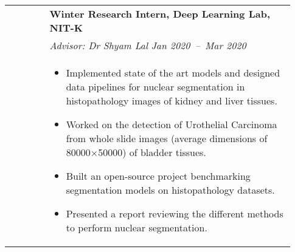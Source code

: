 \documentclass[letterpaper, 10pt, oneside]{article}
\newcommand{\bdit}[1]{{\textbf{#1}}}
\begin{document}
\begin{longtable}{@{} p{0.13\linewidth} p{0.8\linewidth}}
                         & \bdit{Winter Research Intern, Deep Learning Lab, NIT-K}                                                                                                                                                           \\
                         & \textsl{Advisor: Dr Shyam Lal} \hfill \hspace{-3em} \textsl{Jan 2020\ --\ Mar 2020}                                                                                                                               \\
                         & \parbox{0.8\textwidth}{                                                                                                                                                                                           %
        \begin{itemize}[leftmargin=*, itemsep=-0.88ex, topsep=-0.88ex]
            \item Implemented state of the art models and designed data pipelines for nuclear segmentation in histopathology images of kidney and liver tissues.
            \item Worked on the detection of Urothelial Carcinoma from whole slide images (average dimensions of 80000$\times$50000) of bladder tissues.
            \item Built an open-source project benchmarking segmentation models on histopathology datasets.
            \item Presented a report reviewing the different methods to perform nuclear segmentation.
        \end{itemize}
    }
    \\
    \\


\end{longtable}
\end{document}

